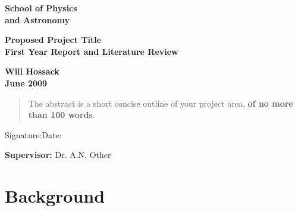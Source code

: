 \documentclass[a4paper,12pt]{article}
\begin{document}
\epsfxsize=40mm                         %
\begin{minipage}[b]{110mm}
        {\Huge\bf School of Physics \\and Astronomy
        \vspace*{17mm}}
\end{minipage}
\hfill
\begin{minipage}[t]{40mm}               
\end{minipage}
\par\noindent                                           %
\vspace*{2cm}
\begin{center}
        \Large\bf Proposed Project Title\\
        \Large\bf First Year Report and Literature Review
\end{center}
\vspace*{1.5cm}
\begin{center}
        \bf Will Hossack\\                 %
        June 2009                         %
\end{center}
\vspace*{5mm}
%
%                       
\begin{abstract}
        The abstract is a short concise outline of your 
        project area, {\bf of no more than 100 words}.
\end{abstract}

\vspace*{1cm}

\vspace*{3cm}
Signature:\hspace*{8cm}Date:

\vfill
{\bf Supervisor:} Dr. A.N. Other                %
\newpage
\setcounter{page}{1}                            %
\footruleheight{1pt}
\headruleheight{1pt}
\rhead{- \thepage}
\cfoot{}
%
\tableofcontents                                %
\section{Background}
\end{document}
